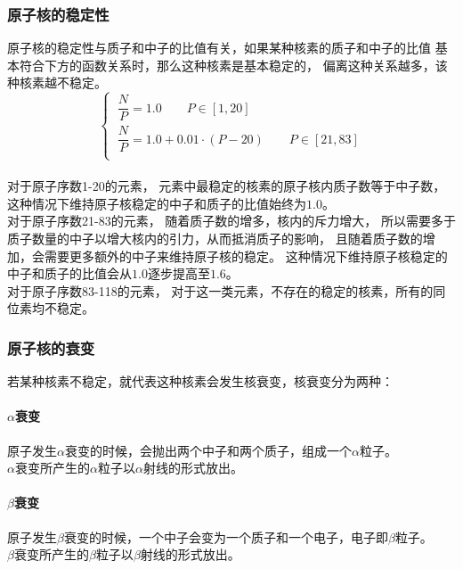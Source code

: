 \documentclass[UTF8]{ctexart}
\begin{document}
\subsubsection{原子核的稳定性}
    原子核的稳定性与质子和中子的比值有关，如果某种核素的质子和中子的比值
    基本符合下方的函数关系时，那么这种核素是基本稳定的，
    偏离这种关系越多，该种核素越不稳定。\\
    \begin{equation*}
        \begin{cases}
            \ \dfrac{N}{P}=1.0\qquad P\in[1,20]\\[6mm]
            \ \dfrac{N}{P}=1.0+0.01\cdot(P-20)\qquad P\in[21,83]\\
        \end{cases}
    \end{equation*}\\
    对于原子序数1-20的元素，
    元素中最稳定的核素的原子核内质子数等于中子数，
    这种情况下维持原子核稳定的中子和质子的比值始终为$1.0$。\\[3mm]
    对于原子序数21-83的元素，
    随着质子数的增多，核内的斥力增大，
    所以需要多于质子数量的中子以增大核内的引力，从而抵消质子的影响，
    且随着质子数的增加，会需要更多额外的中子来维持原子核的稳定。
    这种情况下维持原子核稳定的中子和质子的比值会从$1.0$逐步提高至$1.6$。\\[3mm]
    对于原子序数83-118的元素，
    对于这一类元素，不存在的稳定的核素，所有的同位素均不稳定。

\newpage

\subsubsection{原子核的衰变}
    若某种核素不稳定，就代表这种核素会发生核衰变，核衰变分为两种：

\paragraph{$\alpha$衰变}
    原子发生$\alpha$衰变的时候，会抛出两个中子和两个质子，组成一个$\alpha$粒子。\\[1mm]
    $\alpha$衰变所产生的$\alpha$粒子以$\alpha$射线的形式放出。

\paragraph{$\beta$衰变}
    原子发生$\beta$衰变的时候，一个中子会变为一个质子和一个电子，电子即$\beta$粒子。\\[1mm]
    $\beta$衰变所产生的$\beta$粒子以$\beta$射线的形式放出。\\
\end{document}
